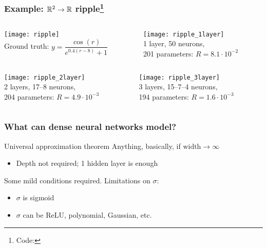 \begin{frame}
    \frametitle{%
        Example: $\mathbb{R}^2 \to \mathbb{R}$ ripple\footnote{%
            Code: %
        }%
    }
    \begin{columns}
        \begin{column}{0.5\textwidth}
            \centering
            \texttt{[image: ripple]} \\
            Ground truth: $y = \dfrac{\cos(r)}{e^{0.4 (r - 8)} + 1}$
        \end{column}
        \hfill
        \begin{column}{0.5\textwidth}
            \centering
            \texttt{[image: ripple\_1layer]} \\
            1 layer, 50 neurons, \\ 201 parameters: $R = 8.1 \cdot 10^{-2}$
        \end{column}
    \end{columns}

    \begin{columns}
        \begin{column}{0.5\textwidth}
            \centering
            \texttt{[image: ripple\_2layer]} \\
            2 layers, 17--8 neurons, \\ 204 parameters: $R = 4.9 \cdot 10^{-3}$
        \end{column}
        \hfill
        \begin{column}{0.5\textwidth}
            \centering
            \texttt{[image: ripple\_3layer]} \\
            3 layers, 15--7--4 neurons, \\ 194 parameters: $R = 1.6 \cdot 10^{-3}$
        \end{column}
    \end{columns}
\end{frame}

\begin{frame}
    \frametitle{What can dense neural networks model?}
    \begin{block}{Universal approximation theorem}
        Anything, basically, if $\text{width} \to \infty$
        \begin{itemize}
            \item Depth not required; 1 hidden layer is enough
        \end{itemize}
    \end{block}

    Some mild conditions required.
    Limitations on $\sigma$:
    \begin{itemize}
        \item $\sigma$ is sigmoid \citep{CybenkoMCSS89,HornikNN89,HornikNN91}
        \item $\sigma$ can be ReLU, polynomial, Gaussian, etc. \citep{SonodaACHA}
    \end{itemize}
\end{frame}

